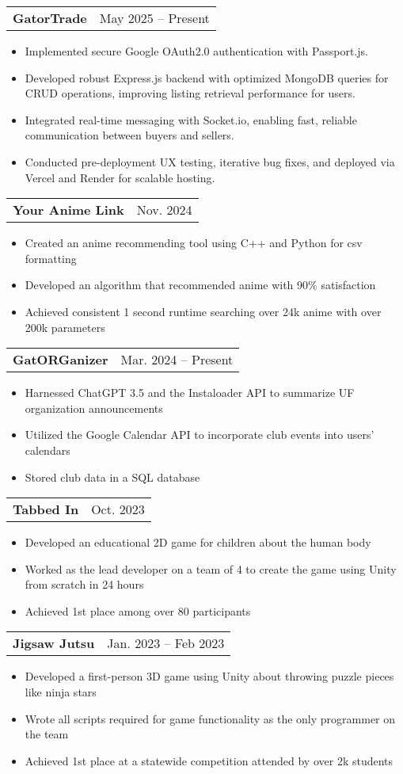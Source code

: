 \documentclass[letterpaper,11pt]{article}
\makeatletter
\newcommand{\resumeItem}[1]{
  \item\small{
    {#1 \vspace{-2pt}}
  }
}
\newcommand{\resumeSubSubheading}[2]{
    \item
    \begin{tabular*}{\textwidth}{l@{\extracolsep{\fill}}r}
      \textit{\small#1} & \textit{\small #2} \\
    \end{tabular*}\vspace{-7pt}
}
\newcommand{\resumeProjectHeading}[2]{
    \item
    \begin{tabular*}{\textwidth}{l@{\extracolsep{\fill}}r}
      \small\textbf{#1} & #2 \\
    \end{tabular*}\vspace{-7pt}
}
\newcommand{\resumeSubHeadingListEnd}{\end{itemize}}
\newcommand{\resumeItemListStart}{\begin{itemize}[leftmargin=0.15in]}
\newcommand{\resumeItemListEnd}{\end{itemize}\vspace{-5pt}}
\makeatother
\begin{document}
      \resumeProjectHeading
      {GatorTrade}{May 2025 -- Present}
      \resumeItemListStart
        \resumeItem{Implemented secure Google OAuth2.0 authentication with Passport.js.}
        \resumeItem{Developed robust Express.js backend with optimized MongoDB queries for CRUD operations, improving listing retrieval performance for users.}
        \resumeItem{Integrated real-time messaging with Socket.io, enabling fast, reliable communication between buyers and sellers.}
        \resumeItem{Conducted pre-deployment UX testing, iterative bug fixes, and deployed via Vercel and Render for scalable hosting.}
      \resumeItemListEnd

    \resumeProjectHeading
      {Your Anime Link}{Nov. 2024}
      \resumeItemListStart
        \resumeItem{Created an anime recommending tool using C++ and Python for csv formatting}
        \resumeItem{Developed an algorithm that recommended anime with 90\% satisfaction}
        \resumeItem{Achieved consistent 1 second runtime searching over 24k anime with over 200k parameters}
    \resumeItemListEnd

    \resumeProjectHeading
      {GatORGanizer}{Mar. 2024 -- Present}
      \resumeItemListStart
        \resumeItem{Harnessed ChatGPT 3.5 and the Instaloader API to summarize UF organization announcements}
        \resumeItem{Utilized the Google Calendar API to incorporate club events into users' calendars}
        \resumeItem{Stored club data in a SQL database}
      \resumeItemListEnd

      \resumeProjectHeading
      {Tabbed In}{Oct. 2023}
      \resumeItemListStart
        \resumeItem{Developed an educational 2D game for children about the human body}
        \resumeItem{Worked as the lead developer on a team of 4 to create the game using Unity from scratch in 24 hours}
        \resumeItem{Achieved 1st place among over 80 participants}
    \resumeItemListEnd

    \resumeProjectHeading
      {Jigsaw Jutsu}{Jan. 2023 -- Feb 2023}
      \resumeItemListStart
        \resumeItem{Developed a first-person 3D game using Unity about throwing puzzle pieces like ninja stars }
        \resumeItem{Wrote all scripts required for game functionality as the only programmer on the team}
        \resumeItem{Achieved 1st place at a statewide competition attended by over 2k students}
    \resumeItemListEnd
\end{document}
